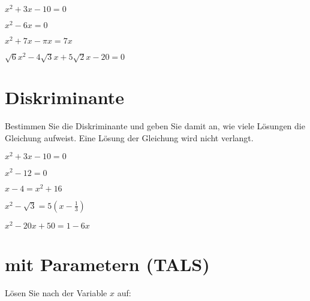 \begin{bbwAufgabenBlock}
\item $ x^2 + 3x - 10= 0$

\item $ x^2 - 6x= 0$

\item $ x^2 + 7x -\pi x= 7x$

\item $ \sqrt{6}x^2 - 4\sqrt{3}x + 5\sqrt{2}x - 20= 0$


\end{bbwAufgabenBlock}
\newpage



\section{Diskriminante}
Bestimmen Sie die Diskriminante und geben Sie damit an, wie viele
Lösungen die Gleichung aufweist. Eine Lösung der Gleichung wird nicht
verlangt.


\begin{bbwAufgabenBlock}
\item $ x^2 + 3x - 10= 0$

\item $ x^2 - 12= 0$

\item $ x-4= x^2 + 16$

\item $ x^2 - \sqrt{3} = 5(x-\frac13)$

\item $ x^2 - 20x + 50 = 1 - 6x$




\end{bbwAufgabenBlock}
\newpage



\section{mit Parametern (TALS)}
Lösen Sie nach der Variable $x$ auf:

